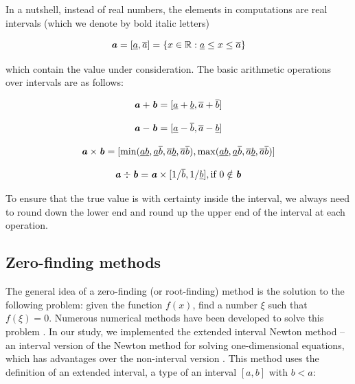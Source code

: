 \documentclass[pre, amsmath, amssymb, onecolumn, showpacs]{revtex4-1}
\begin{document}
In a nutshell, instead of real numbers, the elements in computations are real intervals (which we denote by bold italic letters)

\begin{equation}
\textbf{\emph{a}} = [\underline{a}, \overline{a}] = \{x \in \mathbb{R}: \underline{a} \leq x \leq \overline{a}\}
\end{equation}

which contain the value under consideration. The basic arithmetic operations over intervals are as follows:

\begin{equation}
\textbf{\emph{a}} + \textbf{\emph{b}} = [\underline{a} + \underline{b}, \overline{a} + \overline{b}]
\end{equation}

\begin{equation}
\textbf{\emph{a}} - \textbf{\emph{b}} = [\underline{a} - \overline{b}, \overline{a} - \underline{b}]
\end{equation}

\begin{equation}
\textbf{\emph{a}} \times \textbf{\emph{b}} = [\min(\underline{a} \underline{b}, \underline{a} \overline{b}, \overline{a} \underline{b}, \overline{a} \overline{b}), \max(\underline{a} \underline{b}, \underline{a} \overline{b}, \overline{a} \underline{b}, \overline{a} \overline{b})]
\end{equation}

\begin{equation}
\textbf{\emph{a}} \div \textbf{\emph{b}} = \textbf{\emph{a}} \times [1 / \overline{b}, 1 / \underline{b}], \textrm{if  } 0 \notin \textbf{\emph{b}}
\end{equation}

To ensure that the true value is with certainty inside the interval, we always need to round down the lower end and round up the upper end of the interval at each operation. 

\subsection{Zero-finding methods}

The general idea of a zero-finding (or root-finding) method is the solution to the following problem: given the function $f(x)$, find a number $\xi$ such that $f(\xi) = 0$. Numerous numerical methods have been developed to solve this problem \cite{press2007numerical}. In our study, we implemented the extended interval Newton method – an interval version of the Newton method for solving one-dimensional equations, which has advantages over the non-interval version \cite{tucker2011validated}. This method uses the definition of an extended interval, a type of an interval $[a, b]$ with $b < a$:
\end{document}
